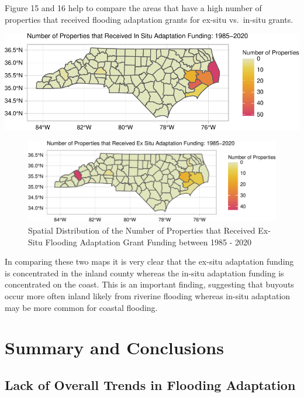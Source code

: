 \documentclass[
  12pt,
]{article}
\begin{document}
\newpage

Figure 15 and 16 help to compare the areas that have a high number of
properties that received flooding adaptation grants for ex-situ
vs.~in-situ grants.

\includegraphics{finalreport_files/figure-latex/unnamed-chunk-27-1.pdf}
\newpage

\begin{figure}
\centering
\includegraphics{finalreport_files/figure-latex/unnamed-chunk-28-1.pdf}
\caption{Spatial Distribution of the Number of Properties that Received
Ex-Situ Flooding Adaptation Grant Funding between 1985 - 2020}
\end{figure}

In comparing these two maps it is very clear that the ex-situ adaptation
funding is concentrated in the inland county whereas the in-situ
adaptation funding is concentrated on the coast. This is an important
finding, suggesting that buyouts occur more often inland likely from
riverine flooding whereas in-situ adaptation may be more common for
coastal flooding.

\newpage

\hypertarget{summary-and-conclusions}{%
\section{Summary and Conclusions}\label{summary-and-conclusions}}

\hypertarget{lack-of-overall-trends-in-flooding-adaptation}{%
\subsection{Lack of Overall Trends in Flooding
Adaptation}\label{lack-of-overall-trends-in-flooding-adaptation}}
\end{document}
